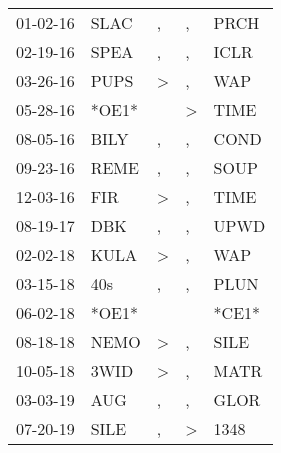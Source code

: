 \begin{supertabular}{lllll}
 01-02-16 &   SLAC &             , &             , &   PRCH \\
 02-19-16 &   SPEA &             , &             , &   ICLR \\
 03-26-16 &   PUPS &  \textgreater &             , &    WAP \\
 05-28-16 &  *OE1* &               &  \textgreater &   TIME \\
 08-05-16 &   BILY &             , &             , &   COND \\
 09-23-16 &   REME &             , &             , &   SOUP \\
 12-03-16 &    FIR &  \textgreater &             , &   TIME \\
 08-19-17 &    DBK &             , &             , &   UPWD \\
 02-02-18 &   KULA &  \textgreater &             , &    WAP \\
 03-15-18 &    40s &             , &             , &   PLUN \\
 06-02-18 &  *OE1* &               &               &  *CE1* \\
 08-18-18 &   NEMO &  \textgreater &             , &   SILE \\
 10-05-18 &   3WID &  \textgreater &             , &   MATR \\
 03-03-19 &    AUG &             , &             , &   GLOR \\
 07-20-19 &   SILE &             , &  \textgreater &   1348 \\
\end{supertabular}
